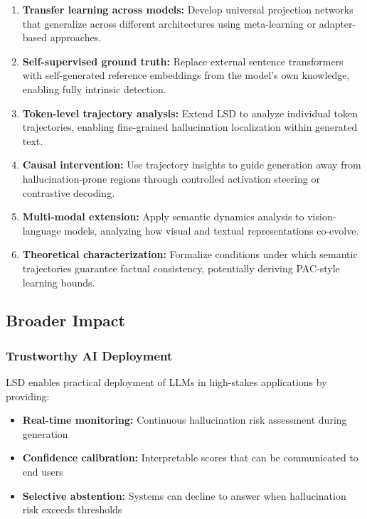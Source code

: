 \documentclass[11pt]{article}
\begin{document}
\begin{enumerate}[leftmargin=*]
    \item \textbf{Transfer learning across models:} Develop universal projection networks that generalize across different architectures using meta-learning or adapter-based approaches.
    
    \item \textbf{Self-supervised ground truth:} Replace external sentence transformers with self-generated reference embeddings from the model's own knowledge, enabling fully intrinsic detection.
    
    \item \textbf{Token-level trajectory analysis:} Extend LSD to analyze individual token trajectories, enabling fine-grained hallucination localization within generated text.
    
    \item \textbf{Causal intervention:} Use trajectory insights to guide generation away from hallucination-prone regions through controlled activation steering or contrastive decoding.
    
    \item \textbf{Multi-modal extension:} Apply semantic dynamics analysis to vision-language models, analyzing how visual and textual representations co-evolve.
    
    \item \textbf{Theoretical characterization:} Formalize conditions under which semantic trajectories guarantee factual consistency, potentially deriving PAC-style learning bounds.
\end{enumerate}

\subsection{Broader Impact}

\subsubsection{Trustworthy AI Deployment}

LSD enables practical deployment of LLMs in high-stakes applications by providing:
\begin{itemize}[leftmargin=*]
    \item \textbf{Real-time monitoring:} Continuous hallucination risk assessment during generation
    \item \textbf{Confidence calibration:} Interpretable scores that can be communicated to end users
    \item \textbf{Selective abstention:} Systems can decline to answer when hallucination risk exceeds thresholds
\end{itemize}
\end{document}
